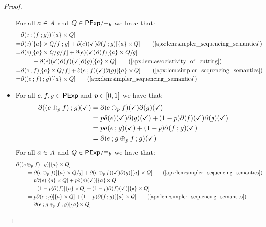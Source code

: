\begin{proof}
\begin{itemize}[leftmargin=0em]
        For all $a \in {A}$ and $Q \in {\mathsf{PExp}}/{\equiv_b}$ we have that:
        \begin{align*}
            &\partial(e \seq (f \seq g))[\{a\} \times Q]\\
            =& \partial(e)[\{a\} \times {Q}/{f \seq g}] + \partial(e)(\checkmark)\partial(f \seq g)[\{a\} \times Q] \tag{\Cref{apx:lem:simpler_sequencing_semantics}} \\
            =& \partial(e)[\{a\} \times {{Q}/{g}}/{f}] + \partial(e)(\checkmark)\partial(f)[\{a\} \times Q/{g}]\\
            &\quad\quad+\partial(e)(\checkmark)\partial(f)(\checkmark)\partial(g)[\{a\} \times Q] \tag{\Cref{apx:lem:associativity_of_cutting}}\\
            =& \partial(e \seq f)[\{a\} \times {Q}/{f}] + \partial(e \seq f)(\checkmark)\partial(g)[\{a\} \times Q] \tag{\Cref{apx:lem:simpler_sequencing_semantics}} \\
            =& \partial((e \seq f) \seq g)[\{a\} \times Q] \tag{\Cref{apx:lem:simpler_sequencing_semantics}}
        \end{align*}

        \item[] 
        For all $e,f,g \in \mathsf{PExp}$ and $p \in \interval{0}{1}$ we have that:
        \begin{align*}
            \partial((e \oplus_p f) \mathbin{;} g)(\checkmark) &= \partial(e \oplus_p f)(\checkmark)\partial(g)(\checkmark)\\
            &=p \partial(e)(\checkmark)\partial(g)(\checkmark) + (1-p)\partial(f)(\checkmark)\partial(g)(\checkmark)\\
            &= p \partial(e \mathbin{;} g)(\checkmark) + (1-p)\partial(f \mathbin{;} g)(\checkmark)\\
            &= \partial(e \mathbin{;} g \oplus_p f \mathbin{;} g)(\checkmark)
        \end{align*}
        For all $a \in {A}$ and $Q \in {\mathsf{PExp}}/{\equiv_b}$ we have that:
        \begin{align*}
            &\partial((e \oplus_p f) \seq g )[\{a\} \times Q]\\ &\quad\quad= \partial(e \oplus_p f)[\{a\} \times {Q}/{g}] + \partial(e \oplus_p f)(\checkmark)\partial(g)[\{a\} \times Q] \tag{\Cref{apx:lem:simpler_sequencing_semantics}}\\
            &\quad\quad=p \partial(e)[\{a\} \times Q ] + p \partial(e)(\checkmark)[\{a\} \times Q]\\
            &\quad\quad\quad\quad (1-p) \partial(f)[\{a\} \times Q ] + (1-p) \partial(f)(\checkmark)[\{a\} \times Q] \\
            &\quad\quad=p \partial(e \seq g)[\{a\} \times Q] + (1-p)\partial(f \seq g)[\{a\} \times Q] \tag{\Cref{apx:lem:simpler_sequencing_semantics}}\\
            &\quad\quad=\partial(e \seq g \oplus_p f \seq g)[\{a\} \times Q]
        \end{align*}


\end{itemize}
\end{proof}
